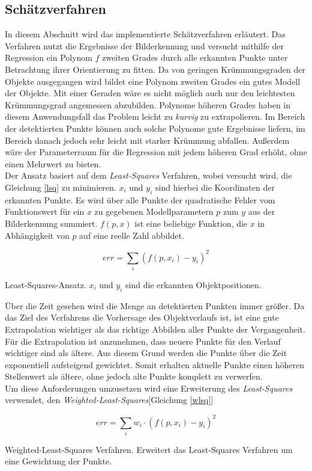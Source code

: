 \subsection{Schätzverfahren}
\label{sec_curveFit}
In diesem Abschnitt wird das implementierte Schätzverfahren erläutert. Das Verfahren nutzt die Ergebnisse der Bilderkennung und versucht mithilfe der Regression ein Polynom $f$ zweiten Grades durch alle erkannten Punkte unter Betrachtung ihrer Orientierung zu fitten. Da von geringen Krümmungsgraden der Objekte ausgegangen wird bildet eine Polynom zweiten Grades ein gutes Modell der Objekte. Mit einer Geraden wäre es nicht möglich auch nur den leichtesten Krümmungsgrad angemessen abzubilden. Polynome höheren Grades haben in diesem Anwendungsfall das Problem leicht zu \textit{kurvig} zu extrapolieren. Im Bereich der detektierten Punkte können auch solche Polynome gute Ergebnisse liefern, im Bereich danach jedoch sehr leicht mit starker Krümmung abfallen. Außerdem wäre der Parameterraum für die Regression mit jedem höheren Grad erhöht, ohne einen Mehrwert zu bieten.\\
Der Ansatz basiert auf dem \textit{Least-Squares} Verfahren\cite{simon2006optimal}, wobei versucht wird, die Gleichung \ref{lsq} zu minimieren.
$x_i$ und $y_i$ sind hierbei die Koordinaten der erkannten Punkte. Es wird über alle Punkte der quadratische Fehler vom Funktionswert für ein $x$ zu gegebenen Modellparametern $p$ zum $y$ aus der Bilderkennung summiert. $f(p,x)$ ist eine beliebige Funktion, die $x$ in Abhängigkeit von $p$ auf eine reelle Zahl abbildet.\\
\begin{ownequation}[H]
\begin{equation}
err = \sum_{i}(f(p,x_i)-y_i)^2
\end{equation}
\caption[Least-Squares-Ansatz]{Least-Squares-Ansatz. $x_i$ und $y_i$ sind die erkannten Objektpositionen.}
\label{lsq}
\end{ownequation}
Über die Zeit gesehen wird die Menge an detektierten Punkten immer größer. Da das Ziel des Verfahrens die Vorhersage des Objektverlaufs ist, ist eine gute Extrapolation wichtiger als das richtige Abbilden aller Punkte der Vergangenheit. Für die Extrapolation ist anzunehmen, dass neuere Punkte für den Verlauf wichtiger sind als ältere. Aus diesem Grund werden die Punkte über die Zeit exponentiell aufsteigend gewichtet. Somit erhalten aktuelle Punkte einen höheren Stellenwert als ältere, ohne jedoch alte Punkte komplett zu verwerfen.\\
Um diese Anforderungen umzusetzen wird eine Erweiterung des \textit{Least-Squares} verwendet, den \textit{Weighted-Least-Squares}[Gleichung \ref{wlsq}]\\
\begin{ownequation}[H]
\begin{equation}
err = \sum_{i}w_i \cdot (f(p,x_i)-y_i)^2
\end{equation}
\caption[Weighted-Least-Squares-Verfahren]{Weighted-Least-Squares Verfahren. Erweitert das Least-Squares Verfahren um eine Gewichtung der Punkte.}
\label{wlsq}
\end{ownequation}

